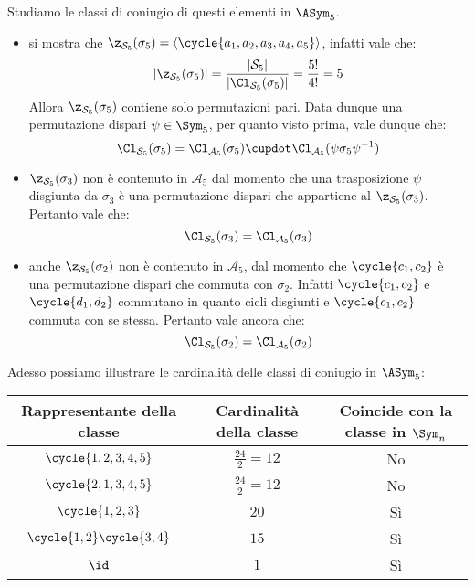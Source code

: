 \documentclass[11pt]{scrartcl}
\begin{document}
	Studiamo le classi di coniugio di questi elementi in $\ASym_5$.
	\begin{itemize}
		\item si mostra che $\z_{\mathcal{S}_5}(\sigma_5) = \langle\cycle{a_1, a_2, a_3, a_4, a_5}\rangle$,
		infatti vale che:
		\[
		\lvert \z_{\mathcal{S}_5}(\sigma_5) \rvert = \frac{\lvert \mathcal{S}_5 \rvert}{\lvert \Cl_{\mathcal{S}_5}(\sigma_5) \rvert} = \frac{5!}{4!} = 5
		\]
		Allora $\z_{\mathcal{S}_5}(\sigma_5)$ contiene solo permutazioni pari.
		Data dunque una permutazione dispari $\psi \in \Sym_5$, per quanto visto prima, vale dunque che:
		\[
		\Cl_{\mathcal{S}_5}(\sigma_5) = \Cl_{\mathcal{A}_5}(\sigma_5) \cupdot \Cl_{\mathcal{A}_5}(\psi\sigma_5\psi^{-1})
		\]
		\item $\z_{\mathcal{S}_5}(\sigma_3)$ non è contenuto in $\mathcal{A}_5$ dal momento
		che una
		trasposizione $\psi$ disgiunta da $\sigma_3$ è una permutazione dispari che
		appartiene al $\z_{\mathcal{S}_5}(\sigma_3)$. Pertanto
		vale che:
		\[
		\Cl_{\mathcal{S}_5}(\sigma_3) = \Cl_{\mathcal{A}_5}(\sigma_3)
		\]
		\item anche $\z_{\mathcal{S}_5}(\sigma_2)$ non è contenuto in $\mathcal{A}_5$,
		dal momento che
		$\cycle{c_1, c_2}$ è una permutazione dispari che commuta
		con $\sigma_2$. Infatti $\cycle{c_1, c_2}$ e $\cycle{d_1, d_2}$ commutano in 
		quanto cicli disgiunti e $\cycle{c_1, c_2}$ commuta con se stessa.
		Pertanto vale ancora che:
		\[
		\Cl_{\mathcal{S}_5}(\sigma_2) = \Cl_{\mathcal{A}_5}(\sigma_2)
		\]
	\end{itemize}
	
	Adesso possiamo illustrare le cardinalità delle classi di coniugio in
	$\ASym_5$:
	
	\begingroup
	\renewcommand{\arraystretch}{1.5}
	\begin{center}
		\begin{tabular}{c|c|c}
			Rappresentante della classe & Cardinalità della classe & Coincide con la classe in $\Sym_n$ \\
			\hline
			$\cycle{1, 2, 3, 4, 5}$ & $\frac{24}{2} = 12$ & No \\
			$\cycle{2, 1, 3, 4, 5}$ & $\frac{24}{2} = 12$ & No \\
			$\cycle{1, 2, 3}$ & $20$ & Sì \\
			$\cycle{1, 2}\cycle{3, 4}$ & $15$ & Sì \\
			$\id$ & $1$ & Sì 
		\end{tabular}
	\end{center}
	\endgroup
	
\end{document}

